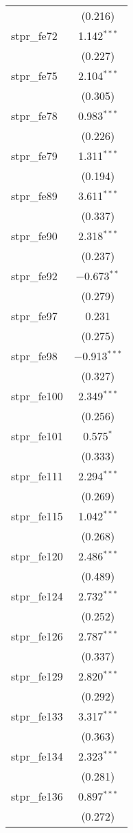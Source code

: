 \begin{table}[!htbp]
\begin{tabular}{@{\extracolsep{5pt}}lc}
  & (0.216) \\ 
  stpr\_fe72 & 1.142$^{***}$ \\ 
  & (0.227) \\ 
  stpr\_fe75 & 2.104$^{***}$ \\ 
  & (0.305) \\ 
  stpr\_fe78 & 0.983$^{***}$ \\ 
  & (0.226) \\ 
  stpr\_fe79 & 1.311$^{***}$ \\ 
  & (0.194) \\ 
  stpr\_fe89 & 3.611$^{***}$ \\ 
  & (0.337) \\ 
  stpr\_fe90 & 2.318$^{***}$ \\ 
  & (0.237) \\ 
  stpr\_fe92 & $-$0.673$^{**}$ \\ 
  & (0.279) \\ 
  stpr\_fe97 & 0.231 \\ 
  & (0.275) \\ 
  stpr\_fe98 & $-$0.913$^{***}$ \\ 
  & (0.327) \\ 
  stpr\_fe100 & 2.349$^{***}$ \\ 
  & (0.256) \\ 
  stpr\_fe101 & 0.575$^{*}$ \\ 
  & (0.333) \\ 
  stpr\_fe111 & 2.294$^{***}$ \\ 
  & (0.269) \\ 
  stpr\_fe115 & 1.042$^{***}$ \\ 
  & (0.268) \\ 
  stpr\_fe120 & 2.486$^{***}$ \\ 
  & (0.489) \\ 
  stpr\_fe124 & 2.732$^{***}$ \\ 
  & (0.252) \\ 
  stpr\_fe126 & 2.787$^{***}$ \\ 
  & (0.337) \\ 
  stpr\_fe129 & 2.820$^{***}$ \\ 
  & (0.292) \\ 
  stpr\_fe133 & 3.317$^{***}$ \\ 
  & (0.363) \\ 
  stpr\_fe134 & 2.323$^{***}$ \\ 
  & (0.281) \\ 
  stpr\_fe136 & 0.897$^{***}$ \\ 
  & (0.272) \\ 

\end{tabular}
\end{table}
